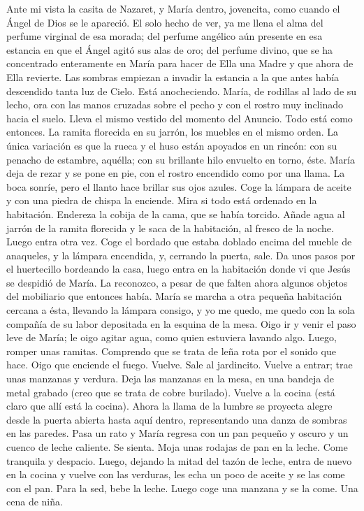\documentclass[12pt]{book} %
\begin{document}
Ante mi vista la casita de Nazaret, y María dentro, jovencita, como cuando el Ángel de Dios se le apareció. El solo hecho de ver, ya me llena el alma del perfume virginal de esa morada; del perfume angélico aún presente en esa estancia en que el Ángel agitó sus alas de oro; del perfume divino, que se ha concentrado enteramente en María para hacer de Ella una Madre y que ahora de Ella revierte. 
Las sombras empiezan a invadir la estancia a la que antes había descendido tanta luz de Cielo. Está anocheciendo. 
María, de rodillas al lado de su lecho, ora con las manos cruzadas sobre el pecho y con el rostro muy inclinado hacia el 
suelo. Lleva el mismo vestido del momento del Anuncio. Todo está como entonces. La ramita florecida en su jarrón, los muebles en el mismo orden. La única variación es que la rueca y el huso están apoyados en un rincón: con su penacho de estambre, aquélla; con su brillante hilo envuelto en torno, éste. 
María deja de rezar y se pone en pie, con el rostro encendido como por una llama. La boca sonríe, pero el llanto hace brillar sus ojos azules. Coge la lámpara de aceite y con una piedra de chispa la enciende. Mira si todo está ordenado en la habitación. Endereza la cobija de la cama, que se había torcido. Añade agua al jarrón de la ramita florecida y le saca de la habitación, al fresco de la noche. Luego entra otra vez. Coge el bordado que estaba doblado encima del mueble de anaqueles, y la lámpara encendida, y, cerrando la puerta, sale. 
Da unos pasos por el huertecillo bordeando la casa, luego entra en la habitación donde vi que Jesús se despidió de María. La reconozco, a pesar de que falten ahora algunos objetos del mobiliario que entonces había. María se marcha a otra pequeña habitación cercana a ésta, llevando la lámpara consigo, y yo me quedo, me quedo con la sola compañía de su labor depositada en la esquina de la mesa. Oigo ir y venir el paso leve de María; le oigo agitar agua, como quien estuviera lavando algo. Luego, romper unas ramitas. Comprendo que se trata de leña rota por el sonido que hace. Oigo que enciende el fuego. 
Vuelve. Sale al jardincito. Vuelve a entrar; trae unas manzanas y verdura. Deja las manzanas en la mesa, en una bandeja 
de metal grabado (creo que se trata de cobre burilado). Vuelve a la cocina (está claro que allí está la cocina). Ahora la llama de la lumbre se proyecta alegre desde la puerta abierta hasta aquí dentro, representando una danza de sombras en las paredes. 
Pasa un rato y María regresa con un pan pequeño y oscuro y un cuenco de leche caliente. Se sienta. Moja unas rodajas 
de pan en la leche. Come tranquila y despacio. Luego, dejando la mitad del tazón de leche, entra de nuevo en la cocina y vuelve con las verduras, les echa un poco de aceite y se las come con el pan. Para la sed, bebe la leche. Luego coge una manzana y se la come. Una cena de niña. 
\end{document}
